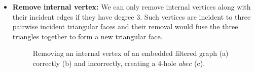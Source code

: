 \begin{itemize}
	\item \textbf{Remove internal vertex:} We can only remove internal vertices along with their incident edges if they have degree 3. Such vertices are incident to three pairwise incident triangular faces and their removal would fuse the three triangles together to form a new triangular face.
\begin{figure}[H]
	\centering
	\quad
	\quad
	\caption{Removing an internal vertex of an embedded filtered graph (a) correctly (b) and incorrectly, creating a 4-hole $abec$ (c).}
	\label{fig:transformation}
\end{figure}


\end{itemize}

